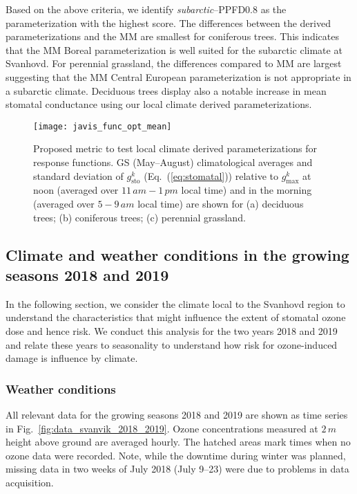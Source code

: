 \documentclass[bg, manuscript]{copernicus}
\begin{document}
Based on the above criteria, we identify \emph{subarctic}--PPFD0.8 as the parameterization with the highest score. The differences between the derived parameterizations and the MM are smallest for coniferous trees. This indicates that the MM Boreal parameterization is well suited for the subarctic climate at Svanhovd. For perennial grassland, the differences compared to MM are largest suggesting that the MM Central European parameterization is not appropriate in a subarctic climate. Deciduous trees display also a notable increase in mean stomatal conductance using our local climate derived parameterizations.

\begin{figure}[t]
  \texttt{[image: javis\_func\_opt\_mean]}
  \caption{Proposed metric to test local climate derived parameterizations for response functions. GS (May--August) climatological averages and standard deviation of $g_\mathrm{sto}^k$ (Eq.~(\ref{eq:stomatal})) relative to $g_\mathrm{max}^k$ at noon (averaged over $11\,\unit{am}-1\,\unit{pm}$ local time) and in the morning (averaged over $5-9\,\unit{am}$ local time) are shown for (a) deciduous trees; (b) coniferous trees; (c) perennial grassland.}
  \label{fig:javis_func_opt_mean}
\end{figure}


\subsection{Climate and weather conditions in the growing seasons 2018 and 2019}
\label{subsec:stats}
In the following section, we consider the climate local to the Svanhovd region to understand the characteristics that might influence the extent of stomatal ozone dose and hence risk. We conduct this analysis for the two years 2018 and 2019 and relate these years to seasonality to understand how risk for ozone-induced damage is influence by climate.

\subsubsection{Weather conditions}
\label{subsec:weather}

All relevant data for the growing seasons 2018 and 2019 are shown as time series in Fig.~\ref{fig:data_svanvik_2018_2019}. Ozone concentrations measured at $2\,\unit{m}$ height above ground are averaged hourly. The hatched areas mark times when no ozone data were recorded. Note, while the downtime during winter was planned, missing data in two weeks of July 2018 (July 9--23) were due to problems in data acquisition.
\end{document}

